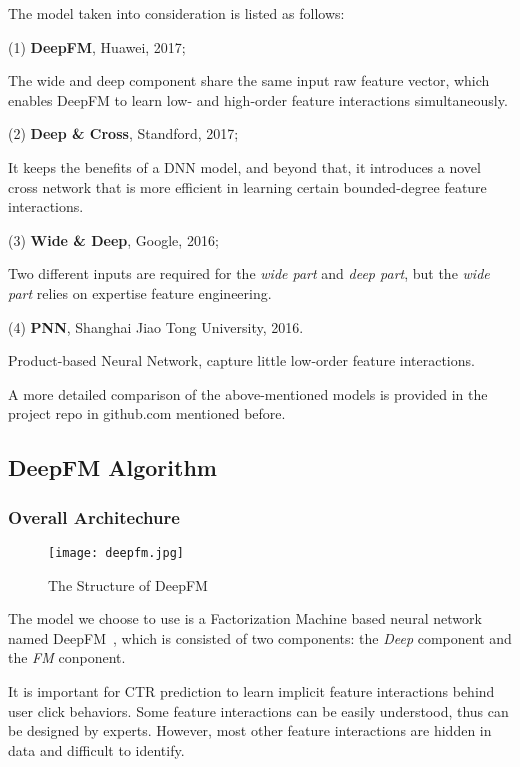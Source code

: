\documentclass{article}
\begin{document}
    The model taken into consideration is listed as follows:
    
    (1) \textbf{DeepFM}, Huawei, 2017;~\cite{guo17:deepfm}

    The wide and deep component share the same input raw feature vector, which enables DeepFM to learn low- and high-order feature interactions simultaneously.

    (2) \textbf{Deep \& Cross}, Standford, 2017;~\cite{wang17:deepcross}

    It keeps the benefits of a DNN model, and beyond that, it introduces a novel cross network that is more efficient in learning certain bounded-degree feature interactions.

    (3) \textbf{Wide \& Deep}, Google, 2016;~\cite{cheng16:widedeep}
    
    Two different inputs are required for the \emph{wide part} and \emph{deep part}, but the \emph{wide part} relies on expertise feature engineering.

    (4) \textbf{PNN}, Shanghai Jiao Tong University, 2016.~\cite{qu17:pnn}

    Product-based Neural Network, capture little low-order feature interactions.

    A more detailed comparison of the above-mentioned models is provided in the project repo in github.com mentioned before.

    \subsection{DeepFM Algorithm}

    \subsubsection{Overall Architechure}

    \begin{figure}[!h]
		\centering
		\texttt{[image: deepfm.jpg]}
		\caption{\small{The Structure of DeepFM~\cite{guo17:deepfm}}}
		\label{fig:deepfm}
	\end{figure}

    The model we choose to use is a Factorization Machine based neural network named DeepFM~\cite{guo17:deepfm}, which is consisted of two components: the \emph{Deep} component and the \emph{FM} conponent. 

    It is important for CTR prediction to learn implicit feature interactions behind user click behaviors. Some feature interactions can be easily understood, thus can be designed by experts. However, most other feature interactions are hidden in data and difficult to identify.
\end{document}

